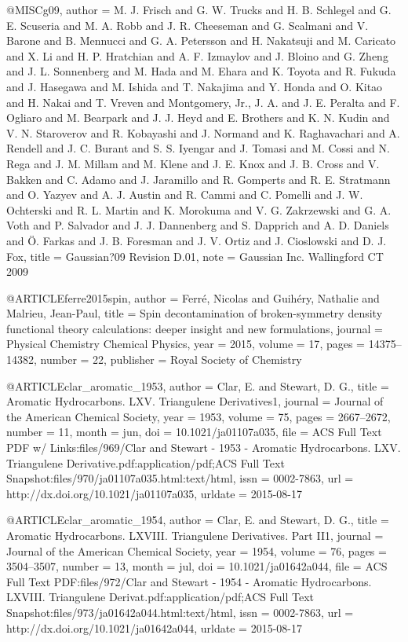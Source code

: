 @MISC{g09,
  author = {M. J. Frisch and G. W. Trucks and H. B. Schlegel and G. E. Scuseria
	and M. A. Robb and J. R. Cheeseman and G. Scalmani and V. Barone
	and B. Mennucci and G. A. Petersson and H. Nakatsuji and M. Caricato
	and X. Li and H. P. Hratchian and A. F. Izmaylov and J. Bloino and
	G. Zheng and J. L. Sonnenberg and M. Hada and M. Ehara and K. Toyota
	and R. Fukuda and J. Hasegawa and M. Ishida and T. Nakajima and Y.
	Honda and O. Kitao and H. Nakai and T. Vreven and Montgomery, {Jr.},
	J. A. and J. E. Peralta and F. Ogliaro and M. Bearpark and J. J.
	Heyd and E. Brothers and K. N. Kudin and V. N. Staroverov and R.
	Kobayashi and J. Normand and K. Raghavachari and A. Rendell and J.
	C. Burant and S. S. Iyengar and J. Tomasi and M. Cossi and N. Rega
	and J. M. Millam and M. Klene and J. E. Knox and J. B. Cross and
	V. Bakken and C. Adamo and J. Jaramillo and R. Gomperts and R. E.
	Stratmann and O. Yazyev and A. J. Austin and R. Cammi and C. Pomelli
	and J. W. Ochterski and R. L. Martin and K. Morokuma and V. G. Zakrzewski
	and G. A. Voth and P. Salvador and J. J. Dannenberg and S. Dapprich
	and A. D. Daniels and Ö. Farkas and J. B. Foresman and J. V. Ortiz
	and J. Cioslowski and D. J. Fox},
  title = {Gaussian?09 {R}evision {D}.01},
  note = {Gaussian Inc. Wallingford CT 2009}
}

@ARTICLE{ferre2015spin,
  author = {Ferr{\'e}, Nicolas and Guih{\'e}ry, Nathalie and Malrieu, Jean-Paul},
  title = {Spin decontamination of broken-symmetry density functional theory
	calculations: deeper insight and new formulations},
  journal = {Physical Chemistry Chemical Physics},
  year = {2015},
  volume = {17},
  pages = {14375--14382},
  number = {22},
  publisher = {Royal Society of Chemistry}
}

@ARTICLE{clar_aromatic_1953,
  author = {Clar, E. and Stewart, D. G.},
  title = {Aromatic {Hydrocarbons}. {LXV}. {Triangulene} {Derivatives}1},
  journal = {Journal of the American Chemical Society},
  year = {1953},
  volume = {75},
  pages = {2667--2672},
  number = {11},
  month = jun,
  doi = {10.1021/ja01107a035},
  file = {ACS Full Text PDF w/ Links:files/969/Clar and Stewart - 1953 - Aromatic Hydrocarbons. LXV.       Triangulene Derivative.pdf:application/pdf;ACS Full Text Snapshot:files/970/ja01107a035.html:text/html},
  issn = {0002-7863},
  url = {http://dx.doi.org/10.1021/ja01107a035},
  urldate = {2015-08-17}
}

@ARTICLE{clar_aromatic_1954,
  author = {Clar, E. and Stewart, D. G.},
  title = {Aromatic {Hydrocarbons}. {LXVIII}. {Triangulene} {Derivatives}. {Part}
	{II}1},
  journal = {Journal of the American Chemical Society},
  year = {1954},
  volume = {76},
  pages = {3504--3507},
  number = {13},
  month = jul,
  doi = {10.1021/ja01642a044},
  file = {ACS Full Text PDF:files/972/Clar and Stewart - 1954 - Aromatic Hydrocarbons. LXVIII. Triangulene Derivat.pdf:application/pdf;ACS Full Text Snapshot:files/973/ja01642a044.html:text/html},
  issn = {0002-7863},
  url = {http://dx.doi.org/10.1021/ja01642a044},
  urldate = {2015-08-17}
}

